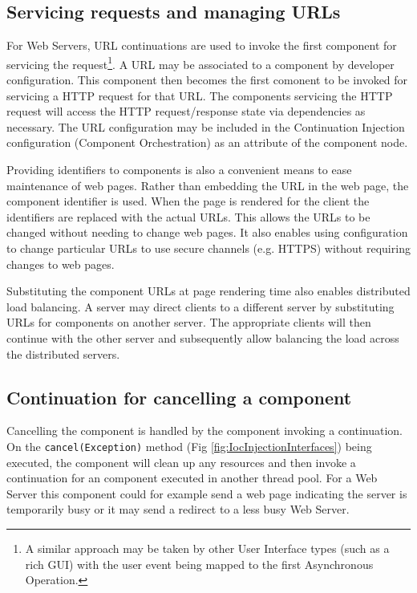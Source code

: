 \documentclass[prodmode]{style/acmlarge}
\begin{document}
\subsection{Servicing requests and managing URLs}

For Web Servers, URL continuations \cite{url-continuation} are used to invoke
the first component for servicing the request\footnote{A similar approach may be
taken by other User Interface types (such as a rich GUI) with the user event
being mapped to the first Asynchronous Operation.}.  A URL may be associated to
a component by developer configuration.  This component then becomes the first
comonent to be invoked for servicing a HTTP request for that URL.  The
components servicing the HTTP request will access the HTTP request/response
state via dependencies as necessary.  The URL configuration may be included in the
Continuation Injection configuration (Component Orchestration) as an attribute
of the component node.

Providing identifiers to components is also a convenient means to
ease maintenance of web pages.  Rather than embedding the URL in the web page,
the component identifier is used.  When the page is rendered for
the client the identifiers are replaced with the actual URLs.  This allows the
URLs to be changed without needing to change web pages.  It also enables using
configuration to change particular URLs to use secure channels (e.g. HTTPS)
without requiring changes to web pages.

Substituting the component URLs at page rendering time also enables distributed
load balancing.  A server may direct clients to a different server by
substituting URLs for components on another server. The appropriate clients will
then continue with the other server and subsequently allow balancing the load
across the distributed servers.


\subsection{Continuation for cancelling a component}

Cancelling the component is handled by the component invoking a continuation.
On the \texttt{cancel(Exception)} method (Fig \ref{fig:IocInjectionInterfaces})
being executed, the component will clean up any resources and then invoke a
continuation for an component executed in another thread pool.  For a Web Server
this component could for example send a web page indicating the server is
temporarily busy or it may send a redirect to a less busy Web Server.
\end{document}
